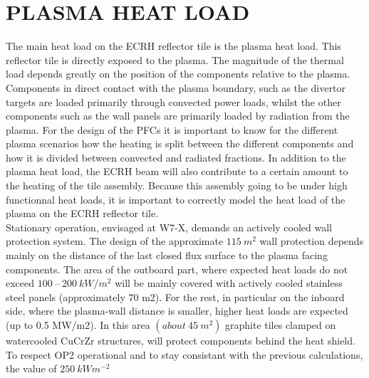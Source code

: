 \section{PLASMA HEAT LOAD}
\normalsize{The main heat load on the \acrshort{ECRH} reflector tile is the plasma heat load. This reflector tile is directly exposed to the plasma. The magnitude of the thermal load depends greatly on the position of the components relative to the plasma. Components in direct contact with the plasma boundary, such as the divertor targets are loaded primarily through convected power loads, whilst the other components such as the wall panels are primarily loaded by radiation from the plasma. For the design of the \acrshort{PFCs} it is important to know for the different plasma scenarios how the heating is split between the different components and how it is divided between convected and radiated fractions. In addition to the plasma heat load, the \acrshort{ECRH} beam will also contribute to a certain amount to the heating of the tile assembly. Because this assembly going to be under high functionnal heat loads, it is important to correctly model the heat load of the plasma on the \acrshort{ECRH} reflector tile.}
\\
\break
\normalsize{\indent Stationary operation, envisaged at \acrshort{W7-X}, demands an actively cooled wall protection system. The design of the approximate $115 \ m^2$ wall protection depends mainly on the distance of the last closed flux surface to the plasma facing components. The area of the outboard part, where expected heat loads do not exceed $100 \ – \ 200 \ kW/m^2$ will be mainly covered with actively cooled stainless steel panels (approximately 70 m2). For the rest, in particular on the inboard side, where the plasma-wall distance is smaller, higher heat loads are expected (up to 0.5 MW/m2). In this area $(about \ 45 \ m^2)$ graphite tiles clamped on watercooled \acrshort{CuCrZr} structures, will protect components behind the heat shield.}
\\
\break
\normalsize{\indent To respect \acrshort{OP2} operational and to stay consistant with the previous calculations, the value of $250 \ kWm^{-2}$  }